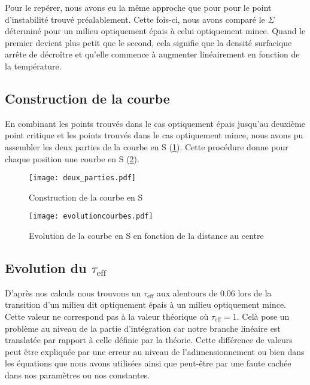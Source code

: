 Pour le repérer, nous avons eu la même approche que pour pour le point d'instabilité trouvé préalablement. Cette fois-ci, nous avons comparé le $\Sigma$ déterminé pour un milieu optiquement épais à celui optiquement mince. Quand le premier devient plus petit que le second, cela signifie que la densité surfacique arrête de décroître et qu'elle commence à augmenter linéairement en fonction de la température. 


\subsection{Construction de la courbe}

En combinant les points trouvés dans le cas optiquement épais jusqu'au deuxième point critique et les points trouvés dans le cas optiquement mince, nous avons pu assembler les deux parties de la courbe en S (\ref{Fig::construction_S}). Cette procédure donne pour chaque position une courbe en S (\ref{Fig::courbe_S_rayons}).

\begin{figure}[htb!]
	\centering
	\texttt{[image: deux\_parties.pdf]}
	\caption{Construction de la courbe en S}
	\label{Fig::construction_S}
\end{figure}

\begin{figure}[htb!]
	\centering
	\texttt{[image: evolutioncourbes.pdf]}
	\caption{Evolution de la courbe en S en fonction de la distance au centre}
	\label{Fig::courbe_S_rayons}
\end{figure}



\subsection{Evolution du $\tau_\textrm{eff}$}

D'après nos calculs nous trouvons un $\tau_\textrm{eff}$ aux alentours de $0.06$ lors de la transition d'un milieu dit optiquement épais à un milieu optiquement mince. Cette valeur ne correspond pas à la valeur théorique où $\tau_\textrm{eff} = 1$.
Celà pose un problème au niveau de la partie d'intégration car notre branche linéaire est translatée par rapport à celle définie par la théorie. 
Cette différence de valeurs peut être expliquée par une erreur au niveau de l’adimensionnement ou bien dans les équations que nous avons utilisées ainsi que peut-être par une faute cachée dans nos paramètres ou nos constantes. 

